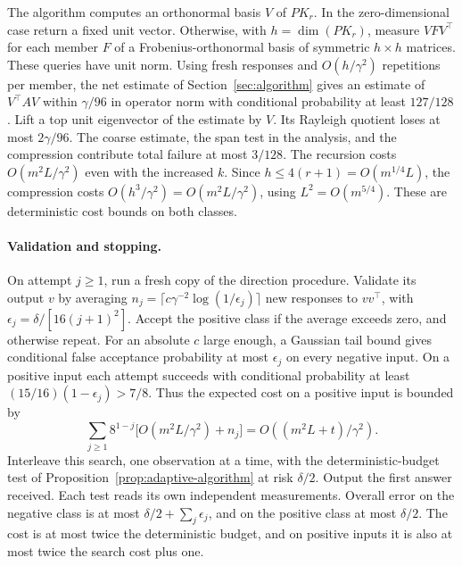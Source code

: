 The algorithm computes an orthonormal basis \(V\) of \(P K_r\). In the zero-dimensional case return a fixed unit vector. Otherwise, with \(h=\dim(P K_r)\), measure \(VFV^\top\) for each member \(F\) of a Frobenius-orthonormal basis of symmetric \(h\times h\) matrices. These queries have unit norm. Using fresh responses and \(O(h/\gamma^2)\) repetitions per member, the net estimate of Section~\ref{sec:algorithm} gives an estimate of \(V^\top A V\) within \(\gamma/96\) in operator norm with conditional probability at least \(127/128\). Lift a top unit eigenvector of the estimate by \(V\). Its Rayleigh quotient loses at most \(2\gamma/96\). The coarse estimate, the span test in the analysis, and the compression contribute total failure at most \(3/128\). The recursion costs \(O(m^2 L/\gamma^2)\) even with the increased \(k\). Since \(h\le 4(r+1)=O(m^{1/4}L)\), the compression costs \(O(h^3/\gamma^2)=O(m^2 L/\gamma^2)\), using \(L^2=O(m^{5/4})\). These are deterministic cost bounds on both classes.

\paragraph{Validation and stopping.}
On attempt \(j\ge1\), run a fresh copy of the direction procedure. Validate its output \(v\) by averaging \(n_j=\lceil c\gamma^{-2}\log(1/\epsilon_j)\rceil\) new responses to \(vv^\top\), with \(\epsilon_j=\delta/[16(j+1)^2]\). Accept the positive class if the average exceeds zero, and otherwise repeat. For an absolute \(c\) large enough, a Gaussian tail bound gives conditional false acceptance probability at most \(\epsilon_j\) on every negative input. On a positive input each attempt succeeds with conditional probability at least \((15/16)(1-\epsilon_j)>7/8\). Thus the expected cost on a positive input is bounded by
\[
 \sum_{j\ge1}8^{1-j}\big[O(m^2 L/\gamma^2)+n_j\big]
     =O((m^2 L+t)/\gamma^2).
\]
Interleave this search, one observation at a time, with the deterministic-budget test of Proposition~\ref{prop:adaptive-algorithm} at risk \(\delta/2\). Output the first answer received. Each test reads its own independent measurements. Overall error on the negative class is at most \(\delta/2+\sum_j\epsilon_j\), and on the positive class at most \(\delta/2\). The cost is at most twice the deterministic budget, and on positive inputs it is also at most twice the search cost plus one.

